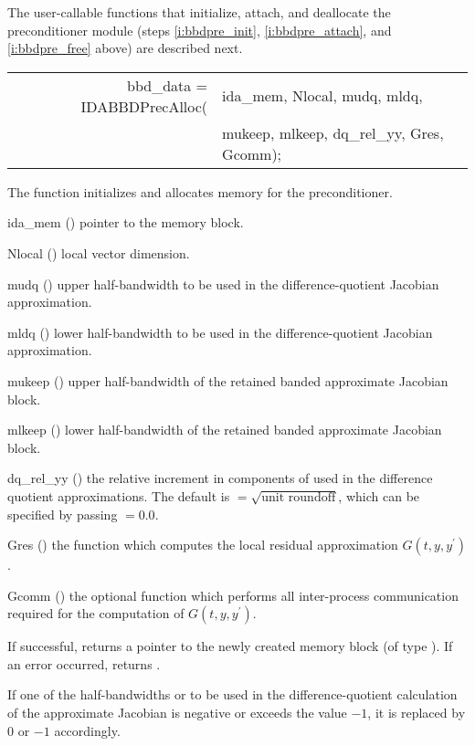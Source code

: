 {\begin{Steps}
\end{Steps}
The user-callable functions that initialize, attach, and deallocate
the {\idabbdpre} preconditioner module (steps \ref{i:bbdpre_init},
\ref{i:bbdpre_attach}, and \ref{i:bbdpre_free} above) are described
next.
{
   \begin{tabular}[t]{@{}r@{}l@{}}
     bbd\_data = IDABBDPrecAlloc(&ida\_mem, Nlocal, mudq, mldq, \\
                                 &mukeep, mlkeep, dq\_rel\_yy, Gres, Gcomm);
   \end{tabular}
}
{
  The function  initializes and allocates
  memory for the {\idabbdpre} preconditioner.
}
{
  \begin{args}[dq\_rel\_yy]
  \item[ida\_mem] ()
    pointer to the {\ida} memory block.
  \item[Nlocal] ()
    local vector dimension.
  \item[mudq] ()
    upper half-bandwidth to be used in the difference-quotient Jacobian approximation.
  \item[mldq] ()
    lower half-bandwidth to be used in the difference-quotient Jacobian approximation.
  \item[mukeep] ()
    upper half-bandwidth of the retained banded approximate Jacobian block.
  \item[mlkeep] ()
    lower half-bandwidth of the retained banded approximate Jacobian block.
  \item[dq\_rel\_yy] ()
    the relative increment in components of  used in the difference quotient
    approximations.  The default 
    is $ = \sqrt{\text{unit roundoff}}$, which
    can be specified by passing $ = 0.0$.
  \item[Gres] ()
    the {\C} function which computes the local residual approximation 
    $G(t,y,y^\prime)$.
  \item[Gcomm] ()
    the optional {\C} function which performs all inter-process communication
    required for the computation of $G(t,y,y^\prime)$.
  \end{args}
}
{
  If successful,  returns a pointer to the newly created 
  {\idabbdpre} memory block (of type ).
  If an error occurred,  returns .
}
{
  If one of the half-bandwidths  or  to be used in the 
  difference-quotient calculation of the approximate Jacobian is negative or 
  exceeds the value $-1$, it is replaced by 0 or $-1$
  accordingly.

}}

